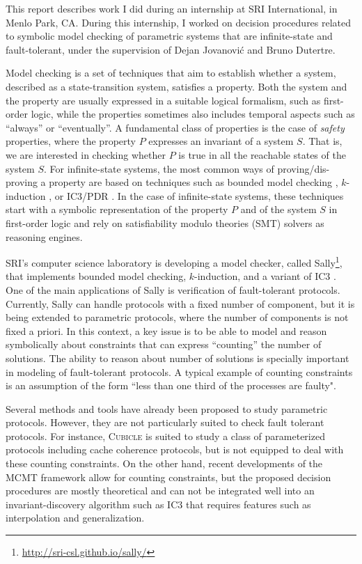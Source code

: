 
This report describes work I did during an internship at SRI
International, in Menlo Park, CA. During this internship, I worked on
decision procedures related to symbolic model checking of parametric
systems that are infinite-state and fault-tolerant, under the
supervision of Dejan Jovanović and Bruno Dutertre.

Model checking is a set of techniques that aim to establish whether a
system, described as a state-transition system, satisfies a property.
Both the system and the property are usually expressed in a suitable
logical formalism, such as first-order logic, while the properties
sometimes also includes temporal aspects such as ``always'' or
``eventually''. A fundamental class of properties is the case of
\emph{safety} properties, where the property $P$ expresses an
invariant of a system $S$. That is, we are interested in checking
whether $P$ is true in all the reachable states of the system $S$. For
infinite-state systems, the most common ways of proving/dis-proving a
property are based on techniques such as bounded model checking
\cite{biere2003bounded}, $k$-induction \cite{sheeran2000checking}, or
IC3/PDR \cite{pdr}. In the case of infinite-state systems, these
techniques start with a symbolic representation of the property $P$
and of the system $S$ in first-order logic and rely on satisfiability
modulo theories (SMT) solvers \cite{barrett2009satisfiability} as
reasoning engines.

SRI's computer science laboratory is developing a model checker,
called Sally\footnote{\url{http://sri-csl.github.io/sally/}}, that
implements bounded model checking, $k$-induction, and a variant of IC3
\cite{jovanovic2016property}. One of the main applications of Sally is
verification of fault-tolerant protocols. Currently, Sally can handle
protocols with a fixed number of component, but it is being extended
to parametric protocols, where the number of components is not fixed a
priori. In this context, a key issue is to be able to model and reason
symbolically about constraints that can express ``counting'' the
number of solutions. The ability to reason about number of solutions
is specially important in modeling of fault-tolerant protocols. A
typical example of counting constraints is an assumption of the form
``less than one third of the processes are faulty".

Several methods and tools have already been proposed to study
parametric protocols. However, they are not particularly suited to
check fault tolerant protocols. For instance, \textsc{Cubicle}
\cite{ConchonGKMZ12} is suited to study a class of parameterized
protocols including cache coherence protocols, but is not equipped to
deal with these counting constraints. On the other hand, recent
developments of the MCMT framework \cite{AlbertiGP16} allow for
counting constraints, but the proposed decision procedures are mostly
theoretical and can not be integrated well into an invariant-discovery
algorithm such as IC3 that requires features such as interpolation and
generalization.

